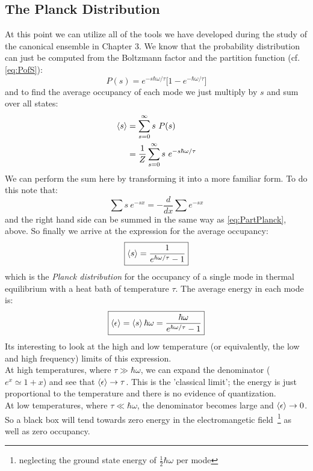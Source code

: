 \subsection{The Planck Distribution}
At this point we can utilize all of the tools we have developed during the study of the canonical ensemble in Chapter 3. We know that the probability 
distribution can just be computed from the Boltzmann factor and the partition 
function (cf.\,\cref{eq:PofS}):
\begin{equation}
P(s) = e^{-s \hbar \omega / \tau} \bigg[ 1 - e^{-\hbar \omega / \tau} \bigg]
\end{equation}
and to find the average occupancy of each mode we just multiply by $s$ and sum over all states:
\begin{align}
\Braket{s} &= \sum_{s=0}^{\infty} s~P(s) \\
           &= \frac{1}{Z} \sum_{s=0}^{\infty} s~e^{-s \hbar \omega / \tau}
\end{align}
We can perform the sum here by transforming it into a more familiar form. To do this note that:
\begin{equation}
\sum s~e^{-s x} = -\frac{d}{dx} \sum e^{-s x}
\end{equation}
and the right hand side can be summed in the same way as \cref{eq:PartPlanck}, above.
So finally we arrive at the expression for the average occupancy:
\begin{equation}
\boxed{\Braket{s} = \frac{1}{e^{\hbar \omega / \tau} - 1}}
\end{equation}
which is the \emph{Planck distribution} for the occupancy of a single mode in thermal equilibrium with a heat bath of temperature $\tau$. The average energy in each mode is:
\begin{equation}
\boxed{\Braket{\epsilon} = \Braket{s} \hbar \omega= 
\frac{\hbar \omega}{e^{\hbar \omega / \tau} - 1}}
\end{equation}
Its interesting to look at the high and low temperature (or equivalently, the low and high frequency) limits of this expression. \\

At high temperatures, where 
$\tau \gg \hbar \omega$, we can expand the denominator ($e^x \simeq 1 + x$) and see
that $\Braket{\epsilon} \to \tau$. This is the 'classical limit'; the energy is just
proportional to the temperature and there is no evidence of quantization.\\

At low temperatures, where $\tau \ll \hbar \omega$, the denominator becomes large
and $\Braket{\epsilon} \to 0$. So a black box will tend towards zero energy in the
electromangetic field~\footnote{neglecting the ground state energy of 
$\frac{1}{2}\hbar \omega$ per mode} as well as zero occupancy. \\

